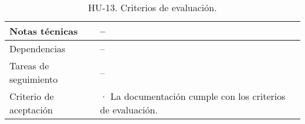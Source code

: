 \begin{table}[H]
\begin{adjustbox}{max width=\textwidth}
\begin{tabularx}{\textwidth}{|l|L|}
        Notas técnicas & – \\ \hline
        Dependencias & – \\ \hline
        Tareas de seguimiento & – \\ \hline
        Criterio de aceptación & · La documentación cumple con los criterios de evaluación. \\ \hline
    \end{tabularx}
    \end{adjustbox}
    \caption{HU-13. Criterios de evaluación.}
\end{table}
